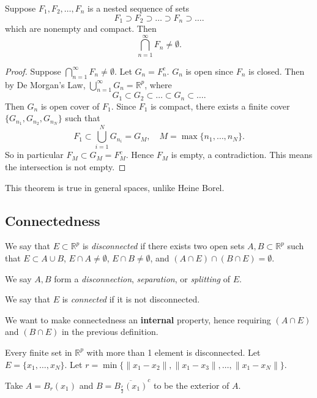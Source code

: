 
\begin{theorem}
	Suppose $F_1, F_2, \ldots, F_n$ is a nested sequence of sets \[
		F_1 \supset F_2 \supset \ldots\supset F_n \supset \ldots
	.\] 
	which are nonempty and compact. Then \[
		\bigcap_{n=1} ^\infty  F_n \neq \emptyset 
	.\] 
\end{theorem}
\begin{proof}
	Suppose $\bigcap_{n=1} ^\infty  F_n \neq \emptyset $. Let $G_n = F_n^c$. $G_n$ is open since $F_n$ is closed. Then by De Morgan's Law, $\bigcup_{n=1} ^\infty G_n= \mathbb{R}^p$, where \[
		G_1 \subset G_2 \subset \ldots\subset G_n \subset \ldots
	.\] 
	Then $G_n$ is open cover of $F_1$. Since $F_1$ is compact, there exists a finite cover $\{G_{n_1}, G_{n_2}, G_{n_N}\} $ such that \[
		F_1 \subset \bigcup_{i=1} ^N G_{n_i}
		= G_M, \quad M = \max \{n_1, \ldots, n_N\} 
	.\] 
	So in particular $F_M \subset G_M = F_M^c$. Hence $F_M$ is empty, a contradiction. This means the intersection is not empty.
\end{proof}
\begin{remark}
	This theorem is true in general spaces, unlike Heine Borel.
\end{remark}

\subsection{Connectedness}

\begin{definition}
	We say that $E\subset \mathbb{R}^p$ is \textit{disconnected} if there exists two open sets $A, B \subset \mathbb{R}^p$ such that $E \subset A \cup B$, $E \cap A \neq  \emptyset $, $E \cap B \neq \emptyset $, and $(A \cap E) \cap (B \cap E) = \emptyset $.

	We say $A, B$ form a \textit{disconnection}, \textit{separation}, or \textit{splitting} of $E$.

	We say that $E$ is \textit{connected} if it is not disconnected.
\end{definition}
\begin{remark}
	We want to make connectedness an \textbf{internal} property, hence requiring $(A \cap E)$ and $(B \cap E)$ in the previous definition.
\end{remark}

\begin{example}
	Every finite set in $\mathbb{R}^p$ with more than 1 element is disconnected. Let $E = \{x_1, \ldots, x_N\} $. Let $r = \min \{\|x_1-x_2\|, \|x_1-x_3\|,\ldots,\|x_1-x_N\|\} $. 

	Take $A = B_r(x_1)$ and $B = \overline{B_{\frac{r}{2}}(x_1)} ^c$ to be the exterior of $A$.
\end{example}

